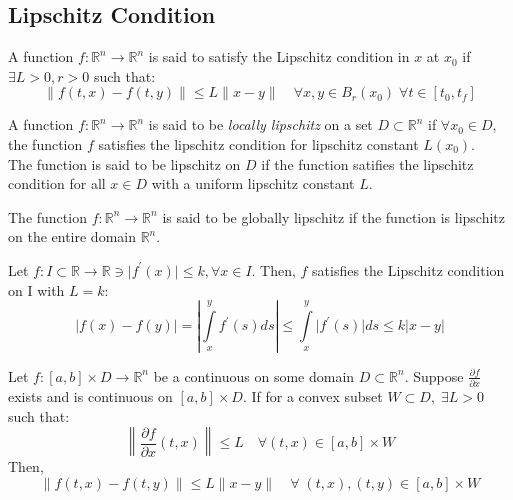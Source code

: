 \subsection{Lipschitz Condition}
A function \(f : \mathbb{R}^n \to \mathbb{R}^n\) is said to satisfy the Lipschitz condition in \(x\) at \(x_0\)
if \(\exists L > 0, r > 0\) such that:
\[
    \lVert f(t,x) - f(t,y) \rVert \leq L \lVert x - y \rVert \quad \forall
     x, y \in B_r(x_0) \; \forall t \in [t_0, t_f]
\]
\begin{definition}
    A function \(f : \mathbb{R}^n \to \mathbb{R}^n\) is said to be \emph{locally lipschitz} on a 
    set \(D \subset \mathbb{R}^n\) if \(\forall x_0 \in D\), the function \(f\) satisfies the
    lipschitz condition for lipschitz constant \(L(x_0)\).\\
    The function is said to be lipschitz on \(D\) if the function satifies the lipschitz condition
    for all \(x \in D\) with a uniform lipschitz constant \(L\).
\end{definition}
The function \(f : \mathbb{R} ^n \to \mathbb{R} ^n\) is said to be globally lipschitz if the function
is lipschitz on the entire domain \(\mathbb{R}^n\).
\begin{example}
    Let \(f: I \subset \mathbb{R} \to \mathbb{R} \ni \vert f^{\prime} (x) \vert \leq k, \forall x \in I\).
    Then, \(f\) satisfies the Lipschitz condition on I with \(L = k\):
    \[
        \lvert f(x) - f(y) \rvert = \left\lvert \int\limits_{x}^{y} f^{\prime} (s) ds \right\rvert \leq
        \int\limits_{x}^{y} \lvert f^{\prime} (s) \rvert ds \leq k \lvert x - y \rvert  
    \]
\end{example}
\begin{lemma}
    Let \(f : [a,b] \times D \to \mathbb{R}^n\) be a continuous on some domain \(D \subset \mathbb{R}^n\). Suppose
    \(\frac{\partial f}{\partial x} \) exists and is continuous on \([a,b] \times D\). If for a convex subset
    \(W \subset D, \; \exists L > 0\) such that:
    \[
        \left\lVert \frac{\partial f}{\partial x} (t,x) \right\rVert \leq L \quad \forall (t,x) \in [a,b] \times W
    \]
    Then,
    \[
        \lVert f(t,x) - f(t,y) \rVert \leq L \lVert x - y \rVert \quad \forall \; (t,x), (t,y) \in [a,b] \times W
    \]
\end{lemma}
